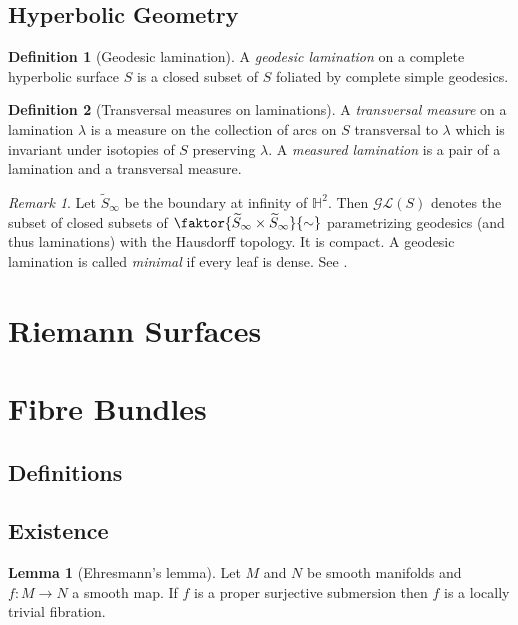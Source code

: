\documentclass[a4paper]{article}
\newcommand{\HH}{\mathbb{H}}
\newcommand{\mcL}{\mathcal L}
\newcommand{\mcG}{\mathcal G}
\newcommand{\lra}{\longrightarrow}
\newcommand{\wt}[1]{\widetilde{#1}}
\theoremstyle{definition}
\newtheorem{lem}{Lemma}
\theoremstyle{definition}
\newtheorem{definition}{Definition}
\theoremstyle{remark}
\newtheorem{rmk}{Remark}
\theoremstyle{remark}
\begin{document}
\subsection{Hyperbolic Geometry}

\begin{definition}[Geodesic lamination]
  A \emph{geodesic lamination} on a complete hyperbolic surface $S$ is a closed subset of $S$ foliated by complete simple geodesics.  
\end{definition}

\begin{definition}[Transversal measures on laminations]
  A \emph{transversal measure} on a lamination $\lambda$ is a measure on the collection of arcs on $S$ transversal to $\lambda$ which  is invariant under isotopies of $S$ preserving $\lambda$. A \emph{measured lamination} is a pair of a lamination and a transversal measure.
\end{definition}

\begin{rmk}
  Let $\wt{S}_{\infty}$ be the boundary at infinity of $\HH^2$. Then $\mcG\mcL(S)$ denotes the subset of closed subsets of $\faktor{\wt{S}_{\infty}\times \wt{S}_{\infty}}{\sim}$ parametrizing geodesics (and thus laminations) with the Hausdorff topology. It is compact. A geodesic lamination is called \emph{minimal} if every leaf is dense. See \cite{Brock2014}.
\end{rmk}
\section{Riemann Surfaces}

\section{Fibre Bundles}

\subsection{Definitions}

\subsection{Existence}


\begin{lem}[Ehresmann's lemma]
  Let $M$ and $N$ be smooth manifolds and $f:M\lra N$ a smooth map. If $f$ is a proper surjective submersion then $f$ is a locally trivial fibration.
\end{lem}
\end{document}
